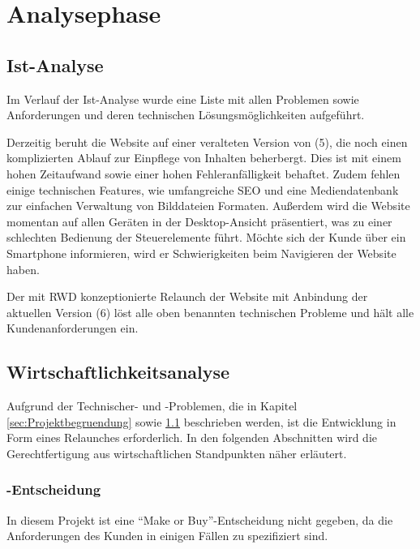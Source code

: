 \section{Analysephase} 
\label{sec:Analysephase}


\subsection{Ist-Analyse} 
\label{sec:IstAnalyse}

Im Verlauf der Ist-Analyse wurde eine Liste mit allen Problemen sowie
Anforderungen und deren technischen Lösungsmöglichkeiten aufgeführt. 

Derzeitig beruht die Website auf einer veralteten Version von \ct (5),
die noch einen komplizierten Ablauf zur Einpflege von Inhalten beherbergt. Dies ist mit
einem hohen Zeitaufwand sowie einer hohen Fehleranfälligkeit behaftet. Zudem
fehlen einige technischen Features, wie \zB umfangreiche \ac{SEO} und eine
Mediendatenbank zur einfachen Verwaltung von Bilddateien \oae Formaten. 
Außerdem wird die Website momentan auf allen Geräten in der Desktop-Ansicht
präsentiert, was zu einer schlechten Bedienung der Steuerelemente führt.
Möchte sich der Kunde über ein Smartphone informieren, wird er
Schwierigkeiten beim Navigieren der Website haben. 

Der mit \ac{RWD} konzeptionierte Relaunch der Website mit Anbindung der
aktuellen \ct Version (6) löst alle oben benannten technischen Probleme und hält
alle Kundenanforderungen ein.

\subsection{Wirtschaftlichkeitsanalyse}
\label{sec:Wirtschaftlichkeitsanalyse}
Aufgrund der Technischer- und -Problemen, die in
Kapitel \ref{sec:Projektbegruendung} 
sowie \ref{sec:IstAnalyse}  beschrieben werden,
ist die Entwicklung in Form eines Relaunches erforderlich. In den folgenden Abschnitten wird die Gerechtfertigung aus wirtschaftlichen Standpunkten näher
erläutert.

\subsubsection{-Entscheidung}
\label{sec:MakeOrBuyEntscheidung}
In diesem Projekt ist eine "`Make or Buy"'-Entscheidung nicht gegeben, da die
Anforderungen des Kunden \kunde in einigen Fällen zu spezifiziert sind.

